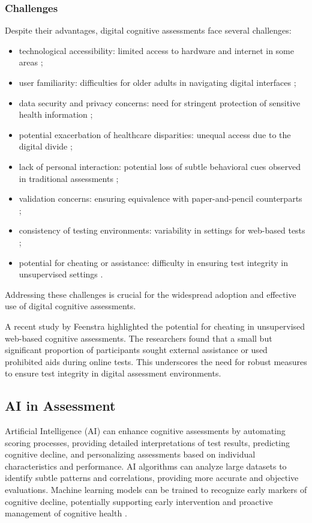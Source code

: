 \subsubsection{Challenges}
Despite their advantages, digital cognitive assessments face several challenges:
\begin{itemize}
\item technological accessibility: limited access to hardware and internet in some areas \cite{Bauer2012};
\item user familiarity: difficulties for older adults in navigating digital interfaces \cite{Zygouris2017};
\item data security and privacy concerns: need for stringent protection of sensitive health information \cite{Bhuyan2017};
\item potential exacerbation of healthcare disparities: unequal access due to the digital divide \cite{Rajkomar2018};
\item lack of personal interaction: potential loss of subtle behavioral cues observed in traditional assessments \cite{Bauer2012};
\item validation concerns: ensuring equivalence with paper-and-pencil counterparts \cite{Wild2021};
\item consistency of testing environments: variability in settings for web-based tests \cite{Geddes2020};
\item potential for cheating or assistance: difficulty in ensuring test integrity in unsupervised settings \cite{Feenstra2017}.
\end{itemize}
Addressing these challenges is crucial for the widespread adoption and effective use of digital cognitive assessments.

A recent study by Feenstra \cite{Feenstra2017} highlighted the potential for cheating in unsupervised web-based cognitive assessments. The researchers found that a small but significant proportion of participants sought external assistance or used prohibited aids during online tests. This underscores the need for robust measures to ensure test integrity in digital assessment environments.

\subsection{AI in Assessment}
Artificial Intelligence (AI) can enhance cognitive assessments by automating scoring processes, providing detailed interpretations of test results, predicting cognitive decline, and personalizing assessments based on individual characteristics and performance. AI algorithms can analyze large datasets to identify subtle patterns and correlations, providing more accurate and objective evaluations. Machine learning models can be trained to recognize early markers of cognitive decline, potentially supporting early intervention and proactive management of cognitive health \cite{Rabinowitz2019}.

